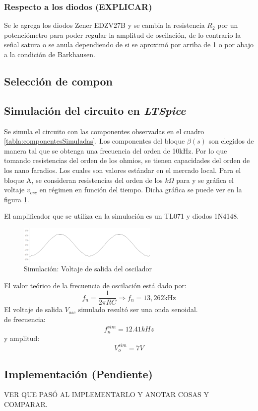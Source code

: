 \subsubsection{Respecto a los diodos (EXPLICAR)}
{\color{red}  Se le agrega los diodos Zener EDZV27B y se cambia la resistencia $R_{2}$ por un potenciómetro para poder regular la amplitud de oscilación, de lo contrario la señal satura o se anula dependiendo de si se aproximó por arriba de 1 o por abajo  a la condición de Barkhausen.}\\

\subsection{Selección de compon}
\subsection{Simulación del circuito en \emph{LTSpice}}
Se simula el circuito con las componentes observadas en el cuadro \ref{tabla:componentesSimuladas}. Los componentes del bloque $\beta(s)$ son elegidos de manera tal que se obtenga una frecuencia del orden de 10kHz. Por lo que tomando resistencias del orden de los ohmios, se tienen capacidades del orden de los nano faradios. Los cuales son valores estándar en el mercado local. Para el bloque A, se consideran resistencias del orden de los $k\Omega$ para  y se gráfica el voltaje $v_{osc}$ en régimen en función del tiempo. Dicha gráfica se puede ver en la figura \ref{sim:Vosc}. %


El amplificador que se utiliza en la simulación es un TL071 y diodos 1N4148.
\begin{figure}[H]
	\centering
	\includegraphics[width=0.6\textwidth]{Oscilador/salida_simulada.png}
	\caption{Simulación: Voltaje de salida del oscilador}
	\label{sim:Vosc}
\end{figure}
El valor teórico de la frecuencia de oscilación está dado por: 
$$f_n=\frac{1}{2\pi RC}\Longrightarrow f_n = 13,262 \si{\kHz}$$
El voltaje de salida $V_{osc}$ simulado resultó ser una onda senoidal.\\
de frecuencia:
$$f_n^{sim}=12.41 kHz$$
y amplitud:
$$V_o^{sim} = 7 V$$
\subsection{Implementación (Pendiente)}
VER QUE PASÓ AL IMPLEMENTARLO Y ANOTAR COSAS Y COMPARAR.





